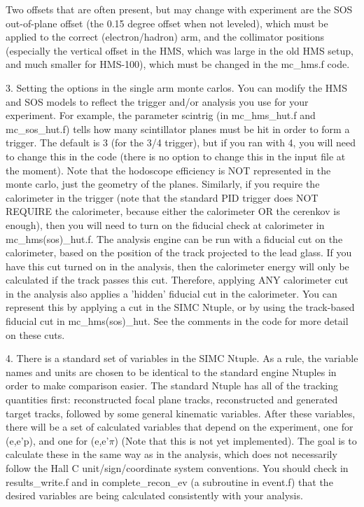 Two offsets that are often present, but may change with experiment are the SOS
out-of-plane offset (the 0.15 degree offset when not leveled), which must be
applied to the correct (electron/hadron) arm, and the collimator positions
(especially the vertical offset in the HMS, which was large in the old HMS
setup, and much smaller for HMS-100), which must be changed in the mc\_hms.f
code.


\smallskip

3. Setting the options in the single arm monte carlos.  You can modify
the HMS and SOS models to reflect the trigger and/or analysis you use
for your experiment.  For example, the parameter scintrig (in mc\_hms\_hut.f
and mc\_sos\_hut.f) tells how many scintillator planes must be hit in order
to form a trigger.  The default is 3 (for the 3/4 trigger), but if you
ran with 4, you will need to change this in the code (there is no option
to change this in the input file at the moment).  Note that the hodoscope
efficiency is NOT represented in the monte carlo, just the geometry of
the planes.  Similarly, if you require the calorimeter in the trigger
(note that the standard PID trigger does NOT REQUIRE the calorimeter,
because either the calorimeter OR the cerenkov is enough), then you will
need to turn on the fiducial check at calorimeter in mc\_hms(sos)\_hut.f.
The analysis engine can be run with a fiducial cut on the calorimeter,
based on the position of the track projected to the lead glass.  If you
have this cut turned on in the analysis, then the calorimeter energy
will only be calculated if the track passes this cut.  Therefore, applying
ANY calorimeter cut in the analysis also applies a 'hidden' fiducial cut
in the calorimeter.  You can represent this by applying a cut in the
SIMC Ntuple, or by using the track-based fiducial cut in mc\_hms(sos)\_hut.
See the comments in the code for more detail on these cuts.

\smallskip

4. There is a standard set of variables in the SIMC Ntuple.  As a rule,
the variable names and units are chosen to be identical to the standard
engine Ntuples in order to make comparison easier.  The standard Ntuple
has all of the tracking quantities first: reconstructed focal plane tracks,
reconstructed and generated target tracks, followed by some general
kinematic variables.  After these variables, there will be a set of
calculated variables that depend on the experiment, one for (e,e'p), and
one for (e,e'$\pi$) (Note that this is not yet implemented).  The goal is
to calculate these in the same way as in the analysis, which does not
necessarily follow the Hall C unit/sign/coordinate system conventions.
You should check in results\_write.f and in complete\_recon\_ev (a subroutine
in event.f) that the desired variables are being calculated consistently
with your analysis.

